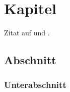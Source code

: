 \chapter{Kapitel}
Zitat auf \cite{Johnson1994} und \cite{Bielawa1992}.
\Blindtext
\section{Abschnitt}
\Blindtext
\subsection{Unterabschnitt}
\Blindtext